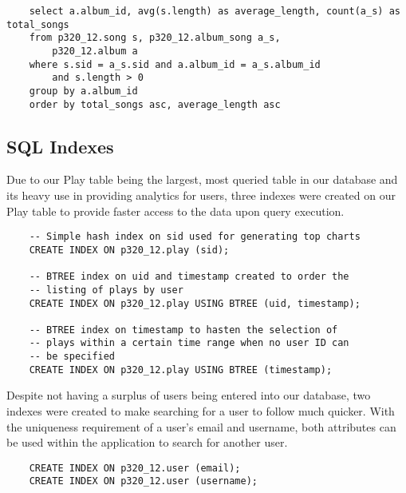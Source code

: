 \documentclass[12pt]{article}
\begin{document}
    \begin{lstlisting}
    select a.album_id, avg(s.length) as average_length, count(a_s) as total_songs
    from p320_12.song s, p320_12.album_song a_s,
        p320_12.album a
    where s.sid = a_s.sid and a.album_id = a_s.album_id
        and s.length > 0
    group by a.album_id
    order by total_songs asc, average_length asc
    \end{lstlisting}







    \subsection{SQL Indexes}
    
    Due to our Play table being the largest, most queried table in
    our database and its heavy use in providing analytics for users,
    three indexes were created on our Play table to
    provide faster access to the data upon query execution.


    \begin{lstlisting}
    -- Simple hash index on sid used for generating top charts
    CREATE INDEX ON p320_12.play (sid);

    -- BTREE index on uid and timestamp created to order the
    -- listing of plays by user
    CREATE INDEX ON p320_12.play USING BTREE (uid, timestamp);

    -- BTREE index on timestamp to hasten the selection of
    -- plays within a certain time range when no user ID can
    -- be specified
    CREATE INDEX ON p320_12.play USING BTREE (timestamp);
    \end{lstlisting}

    \noindent Despite not having a surplus of users being entered into our database,
    two indexes were created to make searching for a user to follow much quicker.
    With the uniqueness requirement of a user's email and username, both attributes
    can be used within the application to search for another user.
    \begin{lstlisting}
    CREATE INDEX ON p320_12.user (email);
    CREATE INDEX ON p320_12.user (username);
    \end{lstlisting}
\end{document}

